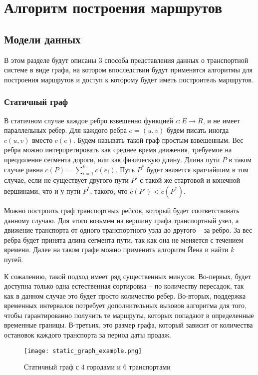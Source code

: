 \chapter{Алгоритм построения маршрутов}

\section{Модели данных}
В этом разделе будут описаны 3 способа представления данных о транспортной системе в виде графа, на котором впоследствии будут применятся алгоритмы для построения маршрутов и доступ к которому будет иметь построитель маршрутов.
\subsection{Статичный граф}
В статичном случае каждое ребро взвешенно функцией $c:E \rightarrow R$, и не имеет параллельных ребер. Для каждого ребра $e=(u, v)$ будем писать иногда $c(u, v)$ вместо $c(e)$. Будем называть такой граф простым взвешенным. Вес ребра можно интерпретировать как среднее время движения, требуемое на преодоление сегмента дороги, или как физическую длину. Длина пути $P$ в таком случае равна $c(P)=\sum_{i=1}^{k}c(e_i)$. Путь $P^*$ будет является кратчайшим в том случае, если не существует другого пути $P'$ с такой же стартовой и конечной вершинами, что и у пути $P^*$, такого, что $c(P')<c(P^*)$.

Можно построить граф транспортных рейсов, который будет соответствовать данному случаю. Для этого возьмем на вершину графа транспортный узел, а движение транспорта от одного транспортного узла до другого -- за ребро. За вес ребра будет принята длина сегмента пути, так как она не меняется с течением времени. Далее на таком графе можно применить алгоритм Йена и найти $k$ путей.

К сожалению, такой подход имеет ряд существенных минусов. Во-первых, будет доступна только одна естественная сортировка -- по количеству пересадок, так как в данном случае это будет просто количество ребер. Во-вторых, поддержка временных интервалов потребует дополнительных вызовов алгоритма для того, чтобы гарантированно получить те маршруты, которых попадают в определенные временные границы. В-третьих, это размер графа, который зависит от количества остановок каждого транспорта за период даты продаж.

\begin{figure}[!h]
	\centering
	\texttt{[image: static\_graph\_example.png]}
	\caption{Статичный граф с 4 городами и 6 транспортами}\label{fig3}
\end{figure}
\FloatBarrier

